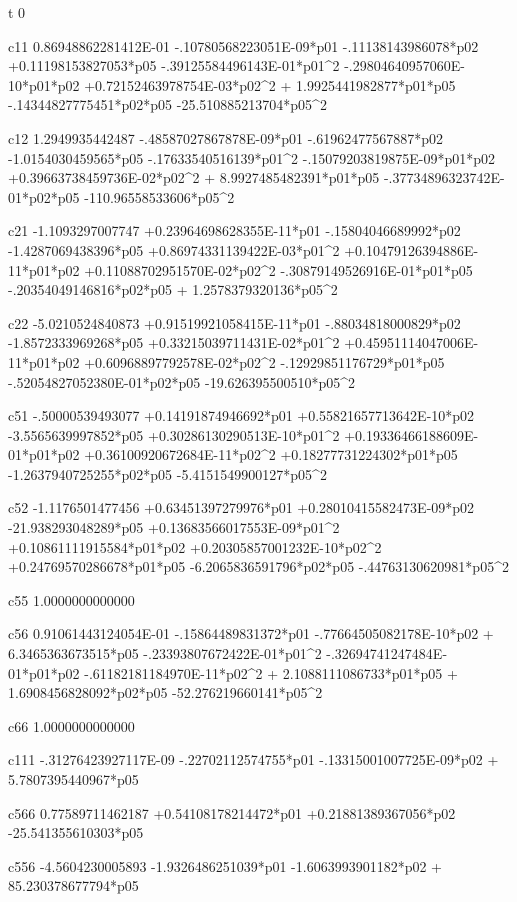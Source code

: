  t      
 0 
  
 c11
  0.86948862281412E-01  -.10780568223051E-09*p01  -.11138143986078*p02 +0.11198153827053*p05  -.39125584496143E-01*p01^2  -.29804640957060E-10*p01*p02 +0.72152463978754E-03*p02^2 + 1.9925441982877*p01*p05  -.14344827775451*p02*p05  -25.510885213704*p05^2 
  
 c12
   1.2949935442487  -.48587027867878E-09*p01  -.61962477567887*p02  -1.0154030459565*p05  -.17633540516139*p01^2  -.15079203819875E-09*p01*p02 +0.39663738459736E-02*p02^2 + 8.9927485482391*p01*p05  -.37734896323742E-01*p02*p05  -110.96558533606*p05^2 
  
 c21
  -1.1093297007747 +0.23964698628355E-11*p01  -.15804046689992*p02  -1.4287069438396*p05 +0.86974331139422E-03*p01^2 +0.10479126394886E-11*p01*p02 +0.11088702951570E-02*p02^2  -.30879149526916E-01*p01*p05  -.20354049146816*p02*p05 + 1.2578379320136*p05^2 
  
 c22
  -5.0210524840873 +0.91519921058415E-11*p01  -.88034818000829*p02  -1.8572333969268*p05 +0.33215039711431E-02*p01^2 +0.45951114047006E-11*p01*p02 +0.60968897792578E-02*p02^2  -.12929851176729*p01*p05  -.52054827052380E-01*p02*p05  -19.626395500510*p05^2 
  
 c51
  -.50000539493077 +0.14191874946692*p01 +0.55821657713642E-10*p02  -3.5565639997852*p05 +0.30286130290513E-10*p01^2 +0.19336466188609E-01*p01*p02 +0.36100920672684E-11*p02^2 +0.18277731224302*p01*p05  -1.2637940725255*p02*p05  -5.4151549900127*p05^2 
  
 c52
  -1.1176501477456 +0.63451397279976*p01 +0.28010415582473E-09*p02  -21.938293048289*p05 +0.13683566017553E-09*p01^2 +0.10861111915584*p01*p02 +0.20305857001232E-10*p02^2 +0.24769570286678*p01*p05  -6.2065836591796*p02*p05  -.44763130620981*p05^2 
  
 c55
   1.0000000000000 
  
 c56
  0.91061443124054E-01  -.15864489831372*p01  -.77664505082178E-10*p02 + 6.3465363673515*p05  -.23393807672422E-01*p01^2  -.32694741247484E-01*p01*p02  -.61182181184970E-11*p02^2 + 2.1088111086733*p01*p05 + 1.6908456828092*p02*p05  -52.276219660141*p05^2 
  
 c66
   1.0000000000000 
  
 c111
  -.31276423927117E-09  -.22702112574755*p01  -.13315001007725E-09*p02 + 5.7807395440967*p05 
  
 c566
  0.77589711462187 +0.54108178214472*p01 +0.21881389367056*p02  -25.541355610303*p05 
  
 c556
  -4.5604230005893  -1.9326486251039*p01  -1.6063993901182*p02 + 85.230378677794*p05 
  
